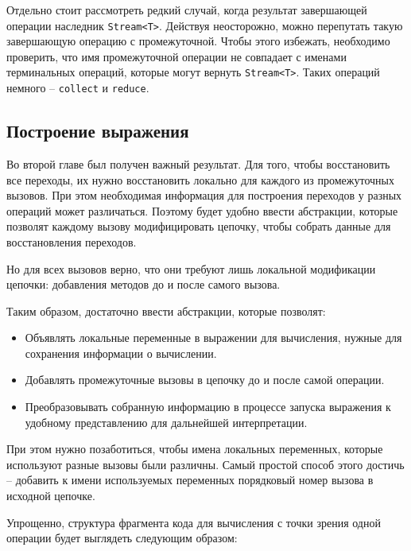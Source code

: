 Отдельно стоит рассмотреть редкий случай, когда результат завершающей операции наследник \texttt{Stream<T>}. Действуя неосторожно, можно перепутать такую завершающую операцию с промежуточной. Чтобы этого избежать, необходимо проверить, что имя промежуточной операции не совпадает с именами терминальных операций, которые могут вернуть \texttt{Stream<T>}. Таких операций немного -- \texttt{collect} и \texttt{reduce}.

\subsection{Построение выражения} 
Во второй главе был получен важный результат. Для того, чтобы восстановить все переходы, их нужно восстановить локально для каждого из промежуточных вызовов. При этом необходимая информация для построения переходов у разных операций может различаться. Поэтому будет удобно ввести абстракции, которые позволят каждому вызову модифицировать цепочку, чтобы собрать данные для восстановления переходов. 

Но для всех вызовов верно, что они требуют лишь локальной модификации цепочки: добавления методов до и после самого вызова. 

Таким образом, достаточно ввести абстракции, которые позволят:
\begin{itemize}
	\item Объявлять локальные переменные в выражении для вычисления, нужные для сохранения информации о вычислении.
	\item Добавлять промежуточные вызовы в цепочку до и после самой операции.
	\item Преобразовывать собранную информацию в процессе запуска выражения к удобному представлению для дальнейшей интерпретации.
\end{itemize}

При этом нужно позаботиться, чтобы имена локальных переменных, которые используют разные вызовы были различны. Самый простой способ этого достичь -- добавить к имени используемых переменных порядковый номер вызова в исходной цепочке.

Упрощенно, структура фрагмента кода для вычисления с точки зрения одной операции будет выглядеть следующим образом:

\inputminted{java}{chapter3/code/EvalCode.java}

